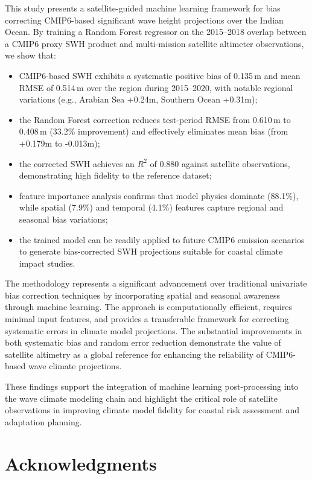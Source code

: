 \documentclass[twocolumn]{article}
\newcommand{\SI}[2]{#1\,#2}
\begin{document}
This study presents a satellite-guided machine learning framework for bias correcting CMIP6-based significant wave height projections over the Indian Ocean. By training a Random Forest regressor on the 2015--2018 overlap between a CMIP6 proxy SWH product and multi-mission satellite altimeter observations, we show that:
\begin{itemize}
  \item CMIP6-based SWH exhibits a systematic positive bias of \SI{0.135}{m} and mean RMSE of \SI{0.514}{m} over the region during 2015--2020, with notable regional variations (e.g., Arabian Sea +0.24m, Southern Ocean +0.31m);
  \item the Random Forest correction reduces test-period RMSE from \SI{0.610}{m} to \SI{0.408}{m} (33.2\% improvement) and effectively eliminates mean bias (from +0.179m to -0.013m);
  \item the corrected SWH achieves an $R^2$ of 0.880 against satellite observations, demonstrating high fidelity to the reference dataset;
  \item feature importance analysis confirms that model physics dominate (88.1\%), while spatial (7.9\%) and temporal (4.1\%) features capture regional and seasonal bias variations;
  \item the trained model can be readily applied to future CMIP6 emission scenarios to generate bias-corrected SWH projections suitable for coastal climate impact studies.
\end{itemize}

The methodology represents a significant advancement over traditional univariate bias correction techniques by incorporating spatial and seasonal awareness through machine learning. The approach is computationally efficient, requires minimal input features, and provides a transferable framework for correcting systematic errors in climate model projections. The substantial improvements in both systematic bias and random error reduction demonstrate the value of satellite altimetry as a global reference for enhancing the reliability of CMIP6-based wave climate projections.

These findings support the integration of machine learning post-processing into the wave climate modeling chain and highlight the critical role of satellite observations in improving climate model fidelity for coastal risk assessment and adaptation planning.

\section*{Acknowledgments}
\end{document}
